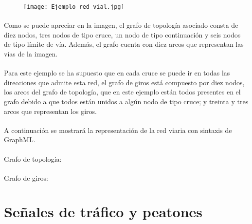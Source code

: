 	\begin{figure}[H]
		\centering
			\texttt{[image: Ejemplo\_red\_vial.jpg]}
	\end{figure}
	
	\paragraph{}
	Como se puede apreciar en la imagen, el grafo de topología asociado consta de diez nodos, tres nodos de tipo cruce, un nodo de tipo continuación y seis nodos de tipo límite de vía. Además, el grafo cuenta con diez arcos que representan las vías de la imagen.
	
	\paragraph{}
	Para este ejemplo se ha supuesto que en cada cruce se puede ir en todas las direcciones que admite esta red, el grafo de giros está compuesto por diez nodos, los arcos del grafo de topología, que en este ejemplo están todos presentes en el grafo debido a que todos están unidos a algún nodo de tipo cruce; y treinta y tres arcos que representan los giros.
	
	\paragraph{}
	A continuación se mostrará la representación de la red viaria con sintaxis de GraphML.
	
	\paragraph{}
	Grafo de topología:
	\tiny
	
	\normalsize
	\paragraph{}	
	Grafo de giros:
	\tiny
	
	\normalsize
	
\section{Señales de tráfico y peatones}

	\paragraph{}
	

